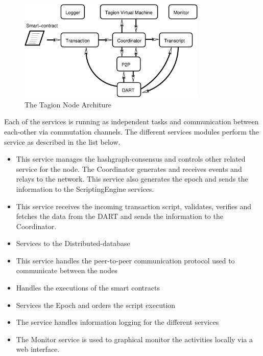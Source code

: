 \begin{figure}[H]
	\centering
	\includegraphics[width=0.8\textwidth]{fig/node_service.eps}
	\caption{The Tagion Node Architure}
	\label{fig:node_service}
\end{figure}


Each of the services is running as independent tasks and communication between each-other via commutation channels. The different services modules perform the service as described in the list below.

\begin{itemize}
	\item[\bfit{Coordinator}] This service manages the hashgraph-consensus and controls other related service for the node. 
	The Coordinator generates and receives events and relays to the network. This service also generates the epoch and sends the information to the ScriptingEngine services.
	\item[\bfit{Transaction}] This service receives the incoming transaction script, validates, verifies and fetches the data from the DART and sends the information to the Coordinator.
	\item[\bfit{DART}] Services to the Distributed-database
	\item[\bfit{P2P}] This service handles the peer-to-peer communication protocol used to communicate between the nodes
	\item[\bfit{TVM}] Handles the executions of the smart contracts
	\item[\bfit{Transcript}] Services the Epoch and orders the script execution
	\item[\bfit{Logger}] The service handles information logging for the different services
	\item[\bfit{Monitor}] The Monitor service is used to graphical monitor the activities locally via a web interface.
\end{itemize}



